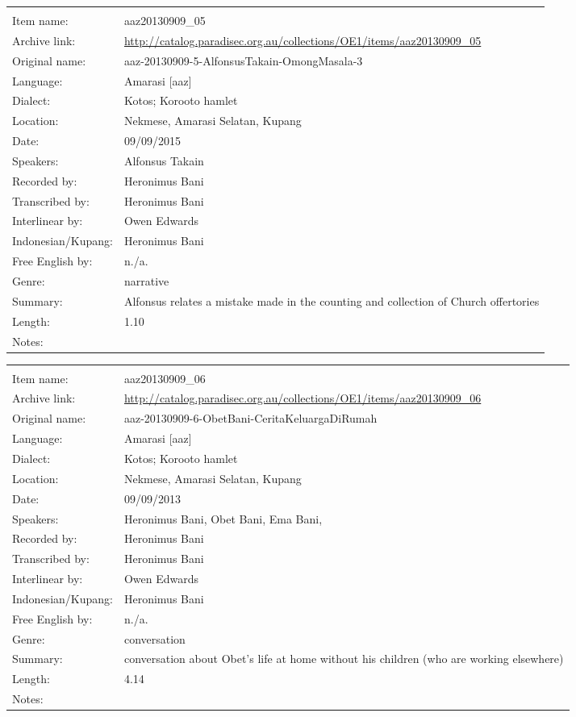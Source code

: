 \newpage
\noindent
\wg\begin{tabular}{lL{.67\textwidth}}
			& \\
Item name:			& aaz20130909{\_}05\\
Archive link:			& \url{http://catalog.paradisec.org.au/collections/OE1/items/aaz20130909_05}\\
Original name:			& aaz-20130909-5-AlfonsusTakain-OmongMasala-3\\
Language:				& Amarasi [aaz] \\
Dialect:				& Kotos; Koro{\Q}oto hamlet \\
Location:				& Nekmese{\Q}, Amarasi Selatan, Kupang \\
Date:				& 09/09/2015\\
Speakers:				& Alfonsus Takain\\
Recorded by:			& Heronimus Bani\\
Transcribed by:		& Heronimus Bani\\
Interlinear by:		& Owen Edwards \\
Indonesian/Kupang:		& Heronimus Bani\\
Free English by:		& n./a.\\
Genre:				& narrative\\
Summary:				& Alfonsus relates a mistake made in the counting and collection of Church offertories\\
Length:				& 1.10\\
Notes:				& \\
\end{tabular}

\newpage
\noindent
\wg\begin{tabular}{lL{.67\textwidth}}
			& \\
Item name:			& aaz20130909{\_}06\\
Archive link:			& \url{http://catalog.paradisec.org.au/collections/OE1/items/aaz20130909_06}\\
Original name:			& aaz-20130909-6-ObetBani-CeritaKeluargaDiRumah\\
Language:				& Amarasi [aaz] \\
Dialect:				& Kotos; Koro{\Q}oto hamlet \\
Location:				& Nekmese{\Q}, Amarasi Selatan, Kupang \\
Date:				& 09/09/2013\\
Speakers:				& Heronimus Bani, Obet Bani, Ema Bani, \\
Recorded by:			& Heronimus Bani\\
Transcribed by:		& Heronimus Bani\\
Interlinear by:		& Owen Edwards \\
Indonesian/Kupang:		& Heronimus Bani\\
Free English by:		& n./a.\\
Genre:				& conversation\\
Summary:				& conversation about Obet's life at home without his children (who are working elsewhere)\\
Length:				& 4.14\\
Notes:				& \\
\end{tabular}

